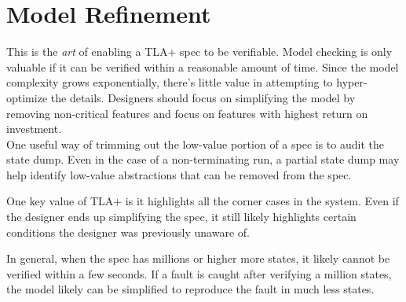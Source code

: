 \section{Model Refinement}

This is the \textit{art} of enabling a TLA+ spec to be verifiable. Model
checking is only valuable if it can be verified within a reasonable amount of
time. Since the model complexity grows exponentially, there's little value in
attempting to hyper-optimize the details.  Designers should focus on simplifying
the model by removing non-critical features and focus on features with highest
return on investment.\\

One useful way of trimming out the low-value portion of a spec is to audit the
state dump. Even in the case of a non-terminating run, a partial state dump may
help identify low-value abstractions that can be removed from the spec.\newline

One key value of TLA+ is it highlights all the corner cases in the system. Even
if the designer ends up simplifying the spec, it still likely highlights certain
conditions the designer was previously unaware of.\newline

In general, when the spec has millions or higher more states, it likely cannot 
be verified within a few seconds. If a fault is caught after verifying a million
states, the model likely can be simplified to reproduce the fault in much less
states.
